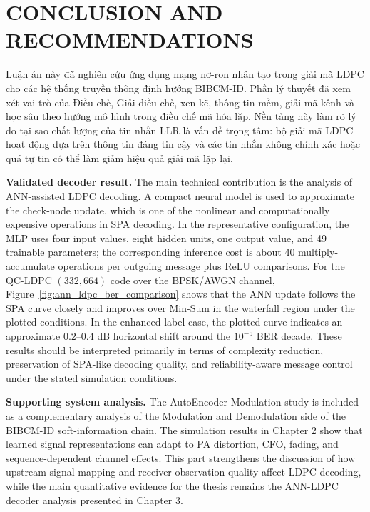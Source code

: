 \chapter*{CONCLUSION AND RECOMMENDATIONS}
Luận án này đã nghiên cứu ứng dụng mạng nơ-ron nhân tạo trong giải mã LDPC cho các hệ thống truyền thông định hướng BIBCM-ID. Phần lý thuyết đã xem xét vai trò của Điều chế, Giải điều chế, xen kẽ, thông tin mềm, giải mã kênh và học sâu theo hướng mô hình trong điều chế mã hóa lặp. Nền tảng này làm rõ lý do tại sao chất lượng của tin nhắn LLR là vấn đề trọng tâm: bộ giải mã LDPC hoạt động dựa trên thông tin đáng tin cậy và các tin nhắn không chính xác hoặc quá tự tin có thể làm giảm hiệu quả giải mã lặp lại.

\noindent\textbf{Validated decoder result.} The main technical contribution is the analysis of ANN-assisted LDPC decoding. A compact neural model is used to approximate the check-node update, which is one of the nonlinear and computationally expensive operations in SPA decoding. In the representative configuration, the MLP uses four input values, eight hidden units, one output value, and 49 trainable parameters; the corresponding inference cost is about 40 multiply-accumulate operations per outgoing message plus ReLU comparisons. For the QC-LDPC $(332,664)$ code over the BPSK/AWGN channel, Figure~\ref{fig:ann_ldpc_ber_comparison} shows that the ANN update follows the SPA curve closely and improves over Min-Sum in the waterfall region under the plotted conditions. In the enhanced-label case, the plotted curve indicates an approximate $0.2$--$0.4$ dB horizontal shift around the $10^{-5}$ BER decade. These results should be interpreted primarily in terms of complexity reduction, preservation of SPA-like decoding quality, and reliability-aware message control under the stated simulation conditions.

\noindent\textbf{Supporting system analysis.} The AutoEncoder Modulation study is included as a complementary analysis of the Modulation and Demodulation side of the BIBCM-ID soft-information chain. The simulation results in Chapter 2 show that learned signal representations can adapt to PA distortion, CFO, fading, and sequence-dependent channel effects. This part strengthens the discussion of how upstream signal mapping and receiver observation quality affect LDPC decoding, while the main quantitative evidence for the thesis remains the ANN-LDPC decoder analysis presented in Chapter 3.

